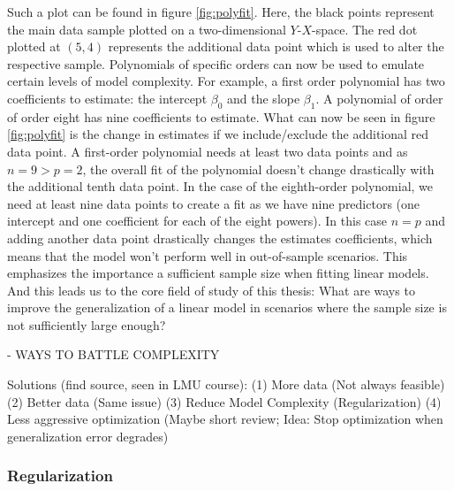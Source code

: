 \documentclass[12pt,a4paper]{article}
\newenvironment{lightbluebox}{%
    \begin{tcolorbox}[colback=lightblue, colframe=lightblue, fontupper=\itshape]%
}{%
    \end{tcolorbox}%
}
\begin{document}
Such a plot can be found in figure \ref{fig:polyfit}. Here, the black points represent the main data sample plotted on a two-dimensional $Y$-$X$-space. The red dot plotted at $(5,4)$ represents the additional data point which is used to alter the respective sample. Polynomials of specific orders can now be used to emulate certain levels of model complexity. For example, a first order polynomial has two coefficients to estimate: the intercept $\beta_0$ and the slope $\beta_1$. A polynomial of order of order eight has nine coefficients to estimate. What can now be seen in figure \ref{fig:polyfit} is the change in estimates if we include/exclude the additional red data point. A first-order polynomial needs at least two data points and as $n=9 > p = 2$, the overall fit of the polynomial doesn't change drastically with the additional tenth data point. In the case of the eighth-order polynomial, we need at least nine data points to create a fit as we have nine predictors (one intercept and one coefficient for each of the eight powers). In this case $n=p$ and adding another data point drastically changes the estimates coefficients, which means that the model won't perform well in out-of-sample scenarios. This emphasizes the importance a sufficient sample size when fitting linear models. And this leads us to the core field of study of this thesis: What are ways to improve the generalization of a linear model in scenarios where the sample size is not sufficiently large enough?


 	
\begin{lightbluebox}

- WAYS TO BATTLE COMPLEXITY

Solutions (find source, seen in LMU course): (1) More data (Not always feasible) (2) Better data (Same issue) (3) Reduce Model Complexity (Regularization) (4) Less aggressive optimization (Maybe short review; Idea: Stop optimization when generalization error degrades)
\end{lightbluebox}


\subsubsection{Regularization}
\end{document}
